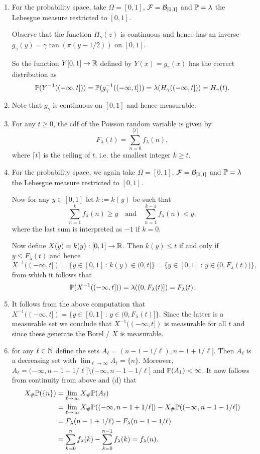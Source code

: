 \documentclass{lecturenotes}
\begin{document}
\begin{enumerate}[label=(\alph*)]
\item For the probability space, take $\Omega = [0,1]$, $\mathcal F = \mathcal B_{[0,1]}$ and $\mathbb P = \lambda$ the Lebesgue measure restricted to $[0,1]$. 

Observe that the function $H_\gamma(z)$ is continuous and hence has an inverse $g_\gamma(y) = \gamma \tan(\pi(y - 1/2))$ on $[0,1]$.

So the function $Y [0,1] \to \mathbb R$ defined by $Y(x) = g_\gamma(x)$ has the correct distribution as
\[
	\mathbb P(Y^{-1}((-\infty,t])) = \mathbb P(g_\gamma^{-1}((-\infty, t])) = \lambda(H_\gamma((-\infty,t])) = H_\gamma(t).
\]
\item Note that $g_\gamma$ is continuous on $[0,1]$ and hence measurable.
\item For any $t \ge 0$, the cdf of the Poisson random variable is given by
\[
	F_\lambda(t) = \sum_{n = 0}^{\lceil t \rceil} f_\lambda(n),
\]
where $\lceil t \rceil$ is the ceiling of $t$, i.e. the smallest integer $k \ge t$.
\item For the probability space, we again take $\Omega = [0,1]$, $\mathcal F = \mathcal B_{[0,1]}$ and $\mathbb P = \lambda$ the Lebesgue measure restricted to $[0,1]$. 

Now for any $y \in [0,1]$ let $k := k(y)$ be such that
\[
	\sum_{n = 1}^k f_\lambda(n) \ge y \quad \text{and} \quad \sum_{n = 1}^{k-1} f_\lambda(n) < y,
\]
where the last sum is interpreted as $-1$ if $k=0$.

Now define $X(y) = k(y) : [0,1] \to \mathbb R$. Then $k(y) \le t$ if and only if $y \le F_\lambda(t)$ and hence
\[
	X^{-1}((-\infty,t]) = \{y \in [0,1] \, : \, k(y) \in (0,t]\}
	= \{y \in [0,1] \, : \, y \in (0, F_\lambda(t)]\},
\]
from which it follows that
\[
	\mathbb P(X^{-1}((-\infty,t])) = \lambda((0, F_\lambda(t)]) = F_\lambda(t).
\]
\item It follows from the above computation that $X^{-1}((-\infty,t]) = \{y \in [0,1] \, : \, y \in (0, F_\lambda(t)]\}$. Since the latter is a measurable set we conclude that $X^{-1}((-\infty,t])$ is measurable for all $t$ and since these generate the Borel \sigalg/ $X$ is measurable.
\item for any $\ell \in \mathbb N$ define the sets $A_\ell = (n-1-1/\ell), n-1 + 1/\ell]$. Then $A_\ell$ is a decreasing set with $\lim_{\ell \to \infty} A_\ell = \{n\}$. Moreover, $A_\ell = (-\infty,n-1+1/\ell] \setminus (-\infty, n-1-1/\ell]$ and $\mathbb P(A_1) < \infty$. It now follows from continuity from above and (d) that
\begin{align*}
	X_\#\mathbb P(\{n\}) &= \lim_{\ell \to \infty} X_\# \mathbb P(A_\ell) \\
	&= \lim_{\ell \to \infty} X_\# \mathbb P((-\infty,n-1+1/\ell])
	- X_\# \mathbb P((-\infty,n-1-1/\ell]) \\
	&= F_\lambda(n-1+1/\ell) - F_\lambda(n-1-1/\ell) \\
	&= \sum_{k = 0}^{n} f_\lambda(k) - \sum_{k = 0}^{n-1} f_\lambda(k) = f_\lambda(n).
\end{align*}
\end{enumerate}
\end{document}
